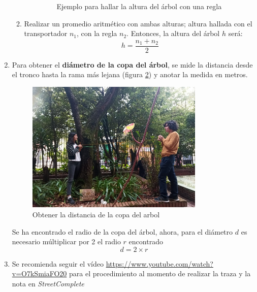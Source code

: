 \documentclass{article}
\begin{document}
\begin{enumerate}
\begin{enumerate}
\begin{itemize}
\begin{figure}[H]
                          \caption{Ejemplo para hallar la altura del árbol con una regla}
                          \label{fig:altura-regla}
                        \end{figure}
                \end{itemize}
          \item Realizar un promedio aritmético con ambas alturas; altura hallada con el transportador \(n_{1}\), con la regla \(n_{2}\). Entonces, la altura del árbol \(h\) será:
                \[
                h = \frac{n_{1} + n_{2}}{2}
                \]
        \end{enumerate}
  \item Para obtener el \textbf{diámetro de la copa del árbol}, se mide la distancia desde el tronco hasta la rama más lejana (figura \ref{fig:copa-arbol}) y anotar la medida en metros.
        \begin{figure}[H]
          \centering
          \includegraphics[width=0.8\textwidth]{img/Copa.jpg}
          \caption{Obtener la distancia de la copa del arbol}
          \label{fig:copa-arbol}
        \end{figure}

        Se ha encontrado el radio de la copa del árbol, ahora, para el diámetro \(d\) es necesario múltiplicar por 2 el radio \(r\) encontrado
        \[
        d = 2 \times r
        \]
  \item Se recomienda seguir el vídeo \url{https://www.youtube.com/watch?v=O7kSmiaFO20} para el procedimiento al momento de realizar la traza y la nota en \textit{StreetComplete}
\end{enumerate}
\end{document}
